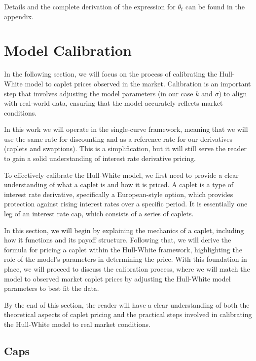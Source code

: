 \documentclass[titlepage, 12pt]{article}
\begin{document}
	Details and the complete derivation of the expression for \( \theta_t \) can be found in the appendix.
	
	\section{Model Calibration}\label{model-calibration}
	
	In the following section, we will focus on the process of calibrating the Hull-White model to caplet prices observed in the market. Calibration is an important step that involves adjusting the model parameters (in our case $k$ and $\sigma$) to align with real-world data, ensuring that the model accurately reflects market conditions.
	
	In this work we will operate in the single-curve framework, meaning that we will use the same rate for discounting and as a reference rate for our derivatives (caplets and swaptions). This is a simplification, but it will still serve the reader to gain a solid understanding of interest rate derivative pricing.
	
	To effectively calibrate the Hull-White model, we first need to provide a clear understanding of what a caplet is and how it is priced. A caplet is a type of interest rate derivative, specifically a European-style option, which provides protection against rising interest rates over a specific period. It is essentially one leg of an interest rate cap, which consists of a series of caplets.
	
	In this section, we will begin by explaining the mechanics of a caplet, including how it functions and its payoff structure. Following that, we will derive the formula for pricing a caplet within the Hull-White framework, highlighting the role of the model's parameters in determining the price. With this foundation in place, we will proceed to discuss the calibration process, where we will match the model to observed market caplet prices by adjusting the Hull-White model parameters to best fit the data.
	
	By the end of this section, the reader will have a clear understanding of both the theoretical aspects of caplet pricing and the practical steps involved in calibrating the Hull-White model to real market conditions.
	
	\subsection{Caps}
	
\end{document}

